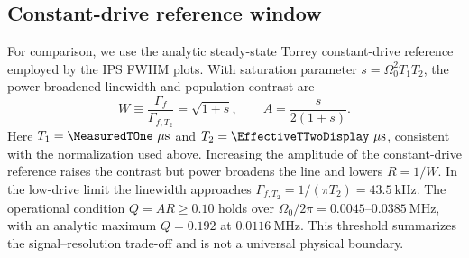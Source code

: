\subsection{Constant-drive reference window}

For comparison, we use the analytic steady-state Torrey constant-drive reference
employed by the IPS FWHM plots.  With saturation parameter
$s=\Omega_0^2 T_1T_2$, the power-broadened linewidth and population contrast
are
\begin{equation}
    W \equiv \frac{\Gamma_f}{\Gamma_{f,T_2}}
      = \sqrt{1+s},
    \qquad
    A = \frac{s}{2(1+s)}.
\end{equation}
Here $T_1=\MeasuredTOne~\mu\mathrm{s}$ and
$T_2=\EffectiveTTwoDisplay~\mu\mathrm{s}$, consistent with the normalization used
above. Increasing the amplitude of the constant-drive reference raises the
contrast but power broadens the line and lowers $R=1/W$. In the low-drive
limit the linewidth approaches
$\Gamma_{f,T_2}=1/(\pi T_2)=43.5~\mathrm{kHz}$.  The operational condition
$Q=AR\geq0.10$ holds over
$\Omega_0/2\pi=0.0045$--$0.0385~\mathrm{MHz}$, with an analytic maximum
$Q=0.192$ at $0.0116~\mathrm{MHz}$.  This threshold summarizes the
signal--resolution trade-off and is not a universal physical boundary.
